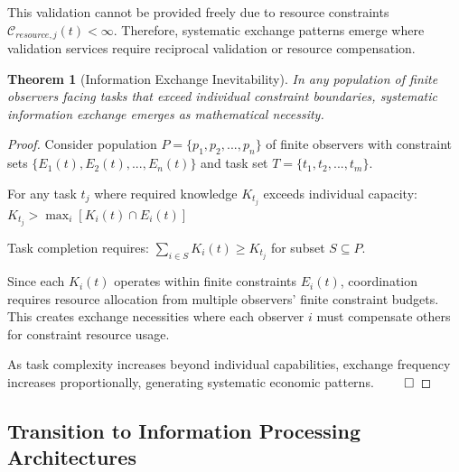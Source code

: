 \documentclass[12pt,a4paper]{article}
\newtheorem{theorem}{Theorem}
\begin{document}
This validation cannot be provided freely due to resource constraints $\mathcal{C}_{resource,j}(t) < \infty$. Therefore, systematic exchange patterns emerge where validation services require reciprocal validation or resource compensation.

\begin{theorem}[Information Exchange Inevitability]
In any population of finite observers facing tasks that exceed individual constraint boundaries, systematic information exchange emerges as mathematical necessity.
\end{theorem}

\begin{proof}
Consider population $P = \{p_1, p_2, ..., p_n\}$ of finite observers with constraint sets $\{E_1(t), E_2(t), ..., E_n(t)\}$ and task set $T = \{t_1, t_2, ..., t_m\}$.

For any task $t_j$ where required knowledge $K_{t_j}$ exceeds individual capacity:
$K_{t_j} > \max_i[K_i(t) \cap E_i(t)]$

Task completion requires: $\sum_{i \in S} K_i(t) \geq K_{t_j}$ for subset $S \subseteq P$.

Since each $K_i(t)$ operates within finite constraints $E_i(t)$, coordination requires resource allocation from multiple observers' finite constraint budgets. This creates exchange necessities where each observer $i$ must compensate others for constraint resource usage.

As task complexity increases beyond individual capabilities, exchange frequency increases proportionally, generating systematic economic patterns. $\qed$
\end{proof}

\subsection{Transition to Information Processing Architectures}
\end{document}
